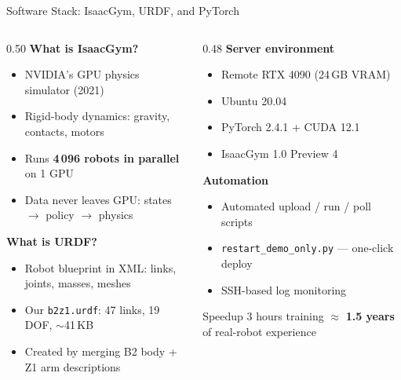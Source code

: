 \documentclass[10pt,aspectratio=169]{beamer}
\newenvironment{keybox}[1][Key Insight]{%
  \begin{exampleblock}{#1}}{\end{exampleblock}}
\begin{document}
\begin{frame}{Software Stack: IsaacGym, URDF, and PyTorch}
  \begin{columns}[T]
    \begin{column}{0.50\textwidth}
      \textbf{What is IsaacGym?}
      \begin{itemize}
        \item NVIDIA's GPU physics simulator (2021)
        \item Rigid-body dynamics: gravity, contacts, motors
        \item Runs \textbf{4\,096 robots in parallel} on 1 GPU
        \item Data never leaves GPU: states $\to$ policy $\to$ physics
      \end{itemize}

      \vspace{4pt}
      \textbf{What is URDF?}
      \begin{itemize}
        \item Robot blueprint in XML: links, joints, masses, meshes
        \item Our \texttt{b2z1.urdf}: 47 links, 19 DOF, $\sim$41\,KB
        \item Created by merging B2 body + Z1 arm descriptions
      \end{itemize}
    \end{column}
    \begin{column}{0.48\textwidth}
      \textbf{Server environment}
      \begin{itemize}
        \item Remote RTX 4090 (24\,GB VRAM)
        \item Ubuntu 20.04
        \item PyTorch 2.4.1 + CUDA 12.1
        \item IsaacGym 1.0 Preview 4
      \end{itemize}

      \vspace{4pt}
      \textbf{Automation}
      \begin{itemize}
        \item Automated upload / run / poll scripts
        \item \texttt{restart\_demo\_only.py} --- one-click deploy
        \item SSH-based log monitoring
      \end{itemize}

      \vspace{4pt}
      \begin{keybox}[Speedup]
        {\small 3 hours training $\approx$ \textbf{1.5 years} of
        real-robot experience}
      \end{keybox}
    \end{column}
  \end{columns}
\end{frame}
\end{document}
